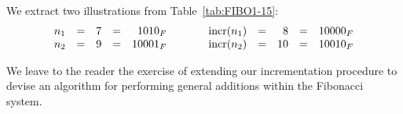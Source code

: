 \bigskip

\noindent We extract two illustrations from Table~\ref{tab:FIBO1-15}:
\[ \begin{array}{ccrcrcccrcr}
n_1 & = & 7 & = & 1010_F & \hspace*{.25in} & 
     \mbox{incr}(n_1) & = & 8 & = & 10000_F  \\ 
n_2 & = & 9 & = & 10001_F & \hspace*{.25in} &
     \mbox{incr}(n_2 ) & = & 10 &  = &10010_F
\end{array}
\]

\bigskip

We leave to the reader the exercise of extending our incrementation procedure to devise an algorithm for performing general additions within the Fibonacci system.


